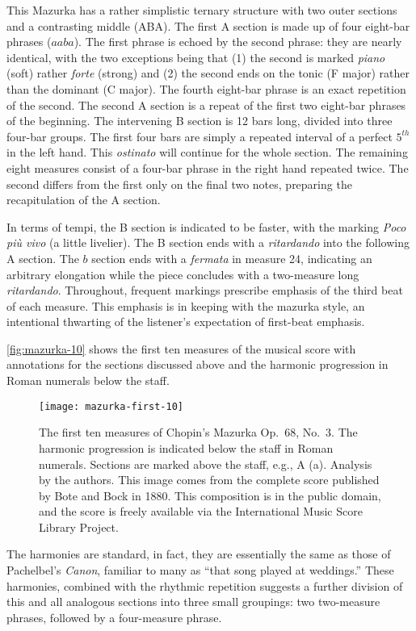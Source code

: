 \documentclass[12pt]{article}
\begin{document}
This Mazurka has a rather simplistic ternary structure with two outer
sections and a contrasting middle (ABA). The first A section is made
up of four eight-bar phrases ($aaba$). The first phrase is echoed by the
second phrase: they are nearly identical, with the two exceptions
being that (1) the
second is marked {\em piano} (soft) rather {\em forte} (strong) and (2)
the second ends on the tonic (F major) rather than the dominant
(C major). The fourth eight-bar phrase is an exact repetition of the
second. The second A section is a repeat of the first two
eight-bar phrases of the beginning. The intervening B section is 12
bars long, divided into three four-bar groups. The first four bars are
simply a repeated interval of a perfect $5^{th}$ in the left
hand. This {\em ostinato} will continue for the whole section. The remaining
eight measures consist of a four-bar phrase in the right hand repeated twice. The second differs from the first only on the final two notes, preparing the
recapitulation of the A section.

In terms of tempi, the B section is indicated to be faster, with the
marking {\em Poco pi\`u vivo} (a little livelier). The B section ends
with a {\em ritardando} into the following A section. The $b$ section ends
with a {\em fermata} in measure 24, indicating an arbitrary
elongation while the piece
concludes with a two-measure long {\em ritardando}. Throughout, 
frequent markings prescribe emphasis of the third beat of each measure. This
emphasis is in keeping with the mazurka style, an intentional
thwarting of the listener's expectation of first-beat emphasis.

\autoref{fig:mazurka-10} shows the first ten measures of the musical
score with annotations for the sections discussed above and the
harmonic progression in Roman numerals below the staff. 
\begin{figure}[t]
  \centering
  \texttt{[image: mazurka-first-10]}
  \caption{The first ten measures of Chopin's Mazurka Op.\ 68, No.\
    3. The harmonic progression is indicated below the staff in Roman
    numerals. Sections are marked above the staff, e.g., A
    (a). Analysis by the authors. This image comes from the complete
    score published by Bote and Bock in 1880. This composition is in
    the public domain, and the score is freely available via the
    International Music Score Library Project.}
  \label{fig:mazurka-10}
\end{figure}
The harmonies are standard, in fact, they are essentially the same as
those of Pachelbel's {\em Canon}, familiar to many as ``that song
played at weddings.'' These harmonies, combined with the
rhythmic repetition suggests a further division of this and
all analogous sections into three small groupings: two two-measure
phrases, followed by a four-measure phrase.
\end{document}
